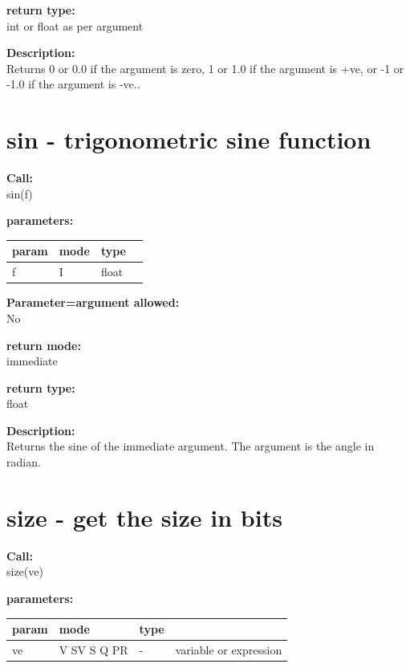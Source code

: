         {\bf return type:} \\
        int or float as per argument
        
        {\bf Description:} \\
        Returns 0 or 0.0 if the argument is zero, 1 or 1.0 if the argument is +ve,
        or -1 or -1.0 if the argument is -ve..


    \section{sin - trigonometric sine function}\label{sec:ifsin}
        
        
        {\bf Call:} \\
        sin(f)
        
        {\bf parameters:} \\
        \begin{tabular}{| l | l | l | l |}
        \hline
        param  & mode & type & \\
        \hline \hline
        f & I & float & \\ \hline
        \end{tabular}
        
        {\bf Parameter=argument allowed:} \\
        No
        
        {\bf return mode:} \\
        immediate

        {\bf return type:} \\
        float
        
        {\bf Description:} \\
        Returns the sine of the immediate argument. The argument is the
        angle in radian.


    \section{size - get the size in bits}\label{sec:ifsize}
        
        {\bf Call:} \\
        size(ve)
        
        {\bf parameters:} \\
        \begin{tabular}{| l | l | l | l |}
        \hline
        param  & mode & type & \\
        \hline \hline
        ve & V SV S Q PR & -   & variable or expression \\ \hline
        \end{tabular}
        
